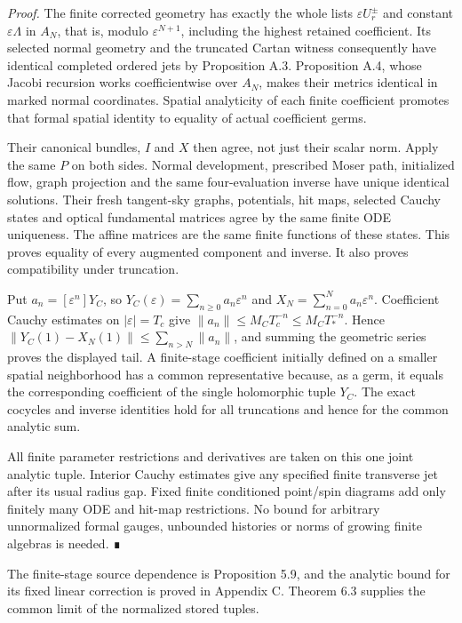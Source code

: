 \documentclass[
  english,
  11pt,
  reqno]{amsart}
\begin{document}
\emph{Proof.} The finite corrected geometry has exactly the whole lists
\(\varepsilon U_r^\pm\) and constant \(\varepsilon\Lambda\) in \(A_N\),
that is, modulo \(\varepsilon^{N+1}\), including the highest retained
coefficient. Its selected normal geometry and the truncated Cartan
witness consequently have identical completed ordered jets by
Proposition A.3. Proposition A.4, whose Jacobi recursion works
coefficientwise over \(A_N\), makes their metrics identical in marked
normal coordinates. Spatial analyticity of each finite coefficient
promotes that formal spatial identity to equality of actual coefficient
germs.

Their canonical bundles, \(I\) and \(X\) then agree, not just their
scalar norm. Apply the same \(P\) on both sides. Normal development,
prescribed Moser path, initialized flow, graph projection and the same
four-evaluation inverse have unique identical solutions. Their fresh
tangent-sky graphs, potentials, hit maps, selected Cauchy states and
optical fundamental matrices agree by the same finite ODE uniqueness.
The affine matrices are the same finite functions of these states. This
proves equality of every augmented component and inverse. It also proves
compatibility under truncation.

Put \(a_n=[\varepsilon^n]Y_C\), so
\(Y_C(\varepsilon)=\sum_{n\ge0}a_n\varepsilon^n\) and
\(X_N=\sum_{n=0}^Na_n\varepsilon^n\). Coefficient Cauchy estimates on
\(|\varepsilon|=T_c\) give \(\|a_n\|\le M_CT_c^{-n}\le M_CT_*^{-n}\).
Hence \(\|Y_C(1)-X_N(1)\|\le\sum_{n>N}\|a_n\|\), and summing the
geometric series proves the displayed tail. A finite-stage coefficient
initially defined on a smaller spatial neighborhood has a common
representative because, as a germ, it equals the corresponding
coefficient of the single holomorphic tuple \(Y_C\). The exact cocycles
and inverse identities hold for all truncations and hence for the common
analytic sum.

All finite parameter restrictions and derivatives are taken on this one
joint analytic tuple. Interior Cauchy estimates give any specified
finite transverse jet after its usual radius gap. Fixed finite
conditioned point/spin diagrams add only finitely many ODE and hit-map
restrictions. No bound for arbitrary unnormalized formal gauges,
unbounded histories or norms of growing finite algebras is needed. ∎

The finite-stage source dependence is Proposition 5.9, and the analytic
bound for its fixed linear correction is proved in Appendix C. Theorem
6.3 supplies the common limit of the normalized stored tuples.
\end{document}

